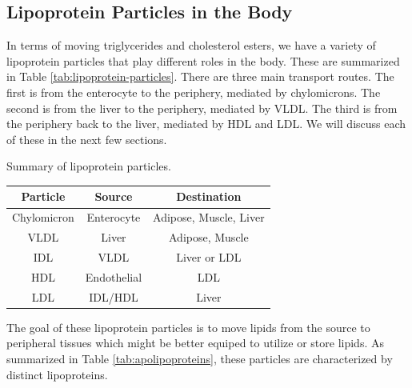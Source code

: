 \documentclass{tufte-handout}
\begin{document}
\subsection{Lipoprotein Particles in the Body}

In terms of moving triglycerides and cholesterol esters, we have a variety of lipoprotein particles that play different roles in the body.  These are summarized in Table \ref{tab:lipoprotein-particles}.  There are three main transport routes.  The first is from the enterocyte to the periphery, mediated by chylomicrons.  The second is from the liver to the periphery, mediated by VLDL.  The third is from the periphery back to the liver, mediated by HDL and LDL.  We will discuss each of these in the next few sections.

\begin{margintable}
\centering
\caption{Summary of lipoprotein particles.}
\label{tab:lipoprotein-particles}
\begin{tabular}{@{}ccc@{}}
\toprule
\textbf{Particle} & \textbf{Source} & \textbf{Destination}       \\ \midrule
Chylomicron       & Enterocyte      & Adipose, Muscle, Liver \\
VLDL              & Liver           & Adipose, Muscle            \\
IDL               & VLDL          & Liver or LDL \\
HDL               & Endothelial     & LDL                        \\
LDL               & IDL/HDL             & Liver                      \\ \bottomrule
\end{tabular}
\end{margintable}


The goal of these lipoprotein particles is to move lipids from the source to peripheral tissues which might be better equiped to utilize or store lipids.  As summarized in Table \ref{tab:apolipoproteins}, these particles are characterized by distinct lipoproteins.
\end{document}
